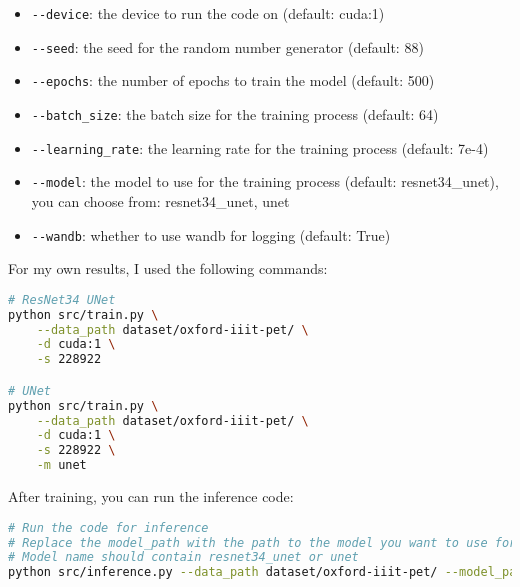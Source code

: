 \begin{itemize}
    \item \lstinline|--device|: the device to run the code on (default: cuda:1)
    \item \lstinline|--seed|: the seed for the random number generator (default: 88)
    \item \lstinline|--epochs|: the number of epochs to train the model (default: 500)
    \item \lstinline|--batch_size|: the batch size for the training process (default: 64)
    \item \lstinline|--learning_rate|: the learning rate for the training process (default: 7e-4)
    \item \lstinline|--model|: the model to use for the training process (default: resnet34\_unet), you can choose from: resnet34\_unet, unet
    \item \lstinline|--wandb|: whether to use wandb for logging (default: True)
\end{itemize}

For my own results, I used the following commands:

\begin{lstlisting}[language=bash, caption=How to run the training code for my own results, label=lst:run_train_code_my_results]
# ResNet34 UNet
python src/train.py \
    --data_path dataset/oxford-iiit-pet/ \
    -d cuda:1 \
    -s 228922

# UNet
python src/train.py \
    --data_path dataset/oxford-iiit-pet/ \
    -d cuda:1 \
    -s 228922 \
    -m unet
\end{lstlisting}

After training, you can run the inference code:

\begin{lstlisting}[language=bash, caption=How to run the inference code, label=lst:run_inference_code]
# Run the code for inference
# Replace the model_path with the path to the model you want to use for the inference
# Model name should contain resnet34_unet or unet
python src/inference.py --data_path dataset/oxford-iiit-pet/ --model_path saved_models/model.pth
\end{lstlisting}
